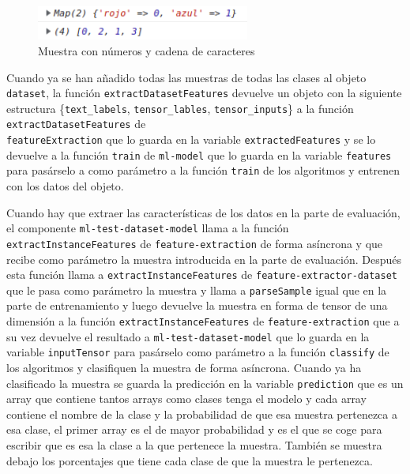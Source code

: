 \documentclass[a4paper, 12pt]{book}
\begin{document}
\begin{figure}
	\centering
	\includegraphics[width=7cm, keepaspectratio]{img/ejemplo2.png}
	\caption{Muestra con números y cadena de caracteres} 	\label{fig:ejemplo2}
\end{figure}

Cuando ya se han añadido todas las muestras de todas las clases al objeto \texttt{dataset}, la función \texttt{extractDatasetFeatures} devuelve un objeto con la siguiente estructura \{\texttt{text\_labels}, \texttt{tensor\_lables}, \texttt{tensor\_inputs}\} a la función \texttt{extractDatasetFeatures} de \\ \texttt{featureExtraction} que lo guarda en la variable \texttt{extractedFeatures} y se lo devuelve a la función \texttt{train} de \texttt{ml-model} que lo guarda en la variable \texttt{features} para pasárselo a como parámetro a la función \texttt{train} de los algoritmos y entrenen con los datos del objeto.

Cuando hay que extraer las características de los datos en la parte de evaluación, el componente \texttt{ml-test-dataset-model} llama a la función \texttt{extractInstanceFeatures} de \texttt{feature-extraction} de forma asíncrona y que recibe como parámetro la muestra introducida en la parte de evaluación. 
Después esta función llama a \texttt{extractInstanceFeatures} de \texttt{feature-extractor-dataset} que le pasa como parámetro la muestra y llama a \texttt{parseSample} igual que en la parte de entrenamiento y luego devuelve la muestra en forma de tensor de una dimensión a la función \texttt{extractInstanceFeatures} de \texttt{feature-extraction} que a su vez devuelve el resultado a \texttt{ml-test-dataset-model} que lo guarda en la variable \texttt{inputTensor} para pasárselo como parámetro a la función \texttt{classify} de los algoritmos y clasifiquen la muestra de forma asíncrona. 
Cuando ya ha clasificado la muestra se guarda la predicción en la variable \texttt{prediction} que es un array que contiene tantos arrays como clases tenga el modelo y cada array contiene el nombre de la clase y la probabilidad de que esa muestra pertenezca a esa clase, el primer array es el de mayor probabilidad y es el que se coge para escribir que es esa la clase a la que pertenece la muestra. 
También se muestra debajo los porcentajes que tiene cada clase de que la muestra le pertenezca.
\end{document}
